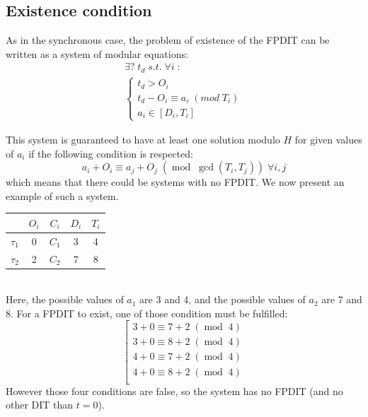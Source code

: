 \documentclass[times, 10pt,twocolumn, a4paper]{article}
\begin{document}
	\subsection{Existence condition}
  \label{sct:FPDITexist}
		As in the synchronous case, the problem of existence of the FPDIT
		can be written as a system of modular equations:
		\[
			\begin{array}{l}
				\exists ? \; t_d \; s.t. \; \forall i \; :\\
				\left\{
					\begin{array}{l}
						t_d > O_i \\
						t_d - O_i \equiv a_i \; (mod \; T_i) \\
						a_i \in [D_i, T_i]
					\end{array}
				\right.
			\end{array}
		\]

		This system is guaranteed to have at least one solution modulo $H$ for given
		values of $a_i$ if the following condition is respected:
		\[
			a_i + O_i \equiv a_j + O_j \; (\operatorname{mod} \; \operatorname{gcd}(T_i,
			T_j)) \; \forall i,j
		\]
		which means that there could be systems with no FPDIT.
		We now present an example of such a system.\\

		\begin{center}
		\begin{tabular}{|r|c|c|c|c|}
		 \hline
		  & $O_i$ & $C_i$ & $D_i$ & $T_i$ \\
		 \hline
		 $\tau_1$ & 0 & $C_1$ & 3 & 4\\
		 \hline
		 $\tau_2$ & 2 & $C_2$ & 7 & 8\\
		 \hline
		\end{tabular}
		\end{center}
		~\\

		Here, the possible values of $a_1$ are 3 and 4, and the possible values
		of $a_2$ are 7 and 8. For a FPDIT to exist, one of those
		condition must be fulfilled:
		\[
		\left[
		\begin{array}{c}
			3 + 0 \equiv 7 + 2 \; (\operatorname{mod} \; 4 ) \\
			3 + 0 \equiv 8 + 2 \; (\operatorname{mod} \; 4 ) \\
			4 + 0 \equiv 7 + 2 \; (\operatorname{mod} \; 4 ) \\
			4 + 0 \equiv 8 + 2 \; (\operatorname{mod} \; 4 ) \\
		\end{array}
		\right.
		\]
		However those four conditions are false, so the system has no FPDIT
		(and no other DIT than $t=0$).
\end{document}
